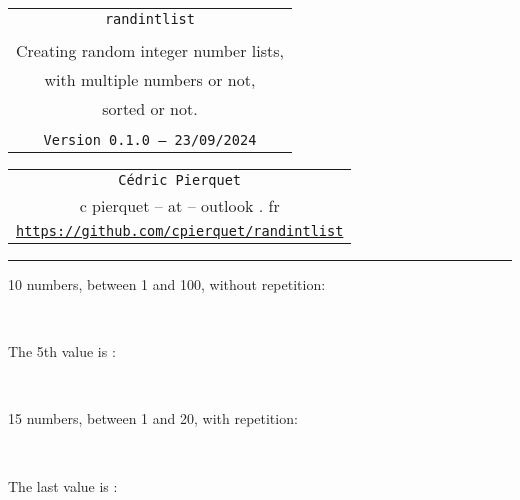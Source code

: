 \documentclass[11pt,a4paper]{ltxdoc}
\def\TPversion{0.1.0}
\def\TPdate{23/09/2024}
\begin{document}
\thispagestyle{empty}

\begin{center}
	\begin{minipage}{0.88\linewidth}
		\begin{tcolorbox}[colframe=yellow,colback=yellow!15]
			\begin{center}
				\renewcommand{\arraystretch}{1.25}%
				\begin{tabular}{c}
					{\Huge \texttt{randintlist}}\\
					\\
					{\LARGE Creating random integer number lists,} \\
					{\LARGE with multiple numbers or not,} \\
					{\LARGE sorted or not.} \\
					\\
					{\small \texttt{Version \TPversion{} -- \TPdate}}
				\end{tabular}
			\end{center}
		\end{tcolorbox}
	\end{minipage}
\end{center}

\begin{center}
	\begin{tabular}{c}
		\texttt{Cédric Pierquet}\\
		{\ttfamily c pierquet -- at -- outlook . fr}\\
		\texttt{\url{https://github.com/cpierquet/randintlist}} \\
	\end{tabular}
\end{center}

\hrule

\vfill

\begin{tcolorbox}[colframe=lightgray,colback=lightgray!5]
10 numbers, between 1 and 100, without repetition:

\hfill\randintlist[min=1,max=100,nb=10]{\mylist}\textcolor{red}{\mylist}\hfill~

The 5th value is :

\hfill\textcolor{blue}{}\hfill~
\end{tcolorbox}

\begin{tcolorbox}[colframe=lightgray,colback=lightgray!5]
15 numbers, between 1 and 20, with repetition:

\hfill\randintlist[min=1,max=20,nb=15,repeat]{\mylist}\textcolor{red}{\mylist}\hfill~

The last value is :

\hfill\textcolor{blue}{}\hfill~
\end{tcolorbox}
\end{document}
